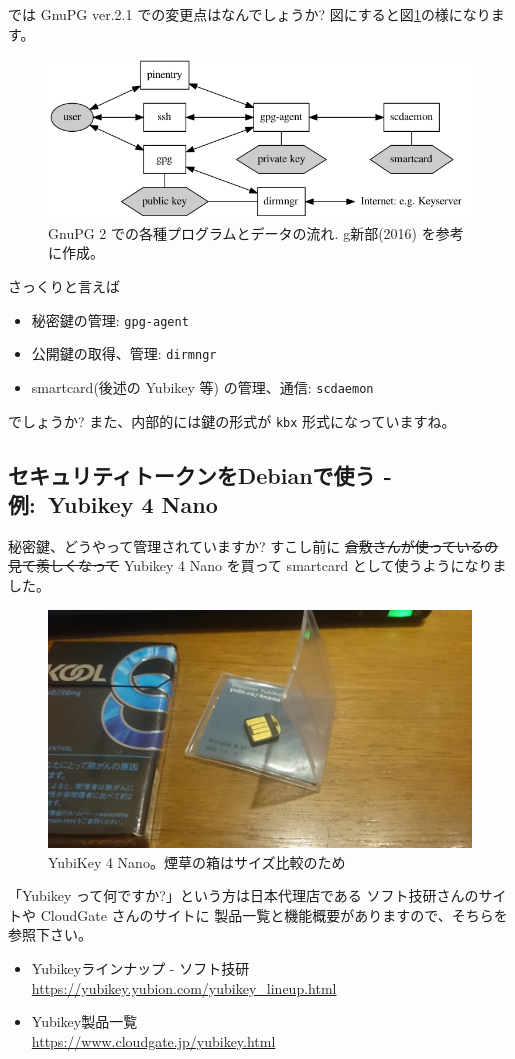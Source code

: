 \documentclass[mingoth,a4paper]{jsarticle}
\begin{document}
では GnuPG ver.2.1 での変更点はなんでしょうか?
図にすると図\ref{figure:GnuPG 2 での各種プログラムとデータの流れ}の様になります。
\begin{figure}[htbp!]
  \centering
  \includegraphics[width=.7\linewidth]{image201705/gnupg2.png}
  \caption{%
    GnuPG 2 での各種プログラムとデータの流れ.
    g新部(2016) を参考に作成。
  }
  \label{figure:GnuPG 2 での各種プログラムとデータの流れ}
\end{figure}
さっくりと言えば
\begin{itemize}
\item 秘密鍵の管理: \texttt{gpg-agent}
\item 公開鍵の取得、管理: \texttt{dirmngr}
\item smartcard(後述の Yubikey 等) の管理、通信:  \texttt{scdaemon}
\end{itemize}
でしょうか? また、内部的には鍵の形式が \texttt{kbx} 形式になっていますね。

\subsection{セキュリティトークンをDebianで使う - 例:~Yubikey 4 Nano}

秘密鍵、どうやって管理されていますか?
%
すこし前に
\sout{倉敷さんが使っているの見て羨しくなって}
Yubikey 4 Nano を買って smartcard として使うようになりました。
\begin{figure}[htbp!]
  \centering
  \includegraphics[width=.6\linewidth]{image201705/Yubikey4Nano.jpg}
  \caption{YubiKey 4 Nano。煙草の箱はサイズ比較のため}
  \label{figure:YubiKey 4 Nano。煙草の箱はサイズ比較のため}
\end{figure}
「Yubikey って何ですか?」という方は日本代理店である
ソフト技研さんのサイトや CloudGate さんのサイトに
製品一覧と機能概要がありますので、そちらを参照下さい。
\begin{itemize}
\item %
  Yubikeyラインナップ - ソフト技研\\
  \url{https://yubikey.yubion.com/yubikey_lineup.html}
\item %
  Yubikey製品一覧 \\
  \url{https://www.cloudgate.jp/yubikey.html}
\end{itemize}
\end{document}
